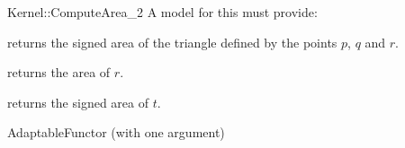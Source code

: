 \begin{ccRefFunctionObjectConcept}{Kernel::ComputeArea_2}
A model for this must provide:


       {returns the signed area of the triangle defined by the points $p$,
       $q$ and $r$. }

       {returns the area of $r$. }

       {returns the signed area of $t$. }

\ccRefines
AdaptableFunctor (with one argument)

\ccSeeAlso
{} \\
  \\

\end{ccRefFunctionObjectConcept}
